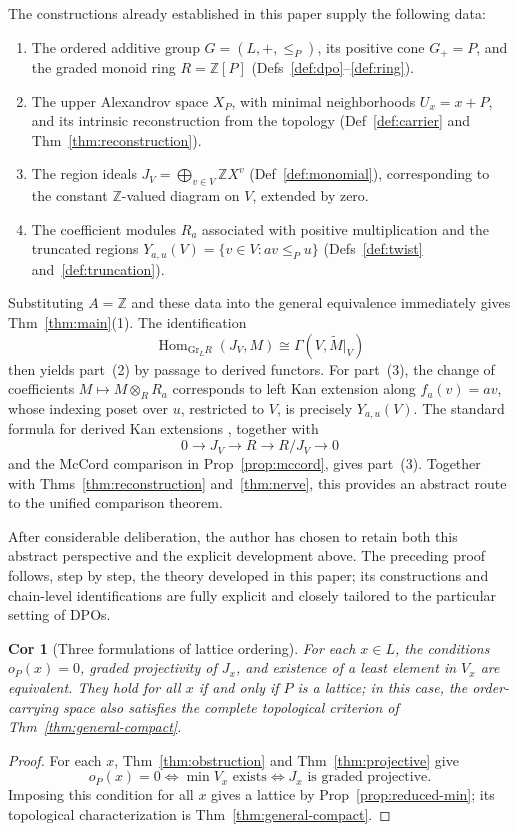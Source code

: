 \documentclass[10pt,letterpaper]{amsart}
\numberwithin{equation}{section}
\newtheorem{cor}[thm]{Cor}
\theoremstyle{definition}
\newcommand{\Z}{\mathbb Z}
\newcommand{\Gr}{\mathrm{Gr}}
\newcommand{\Hom}{\operatorname{Hom}}
\begin{document}
The constructions already established in this paper supply the following data:
\begin{enumerate}
\item The ordered additive group $G=(L,+,\le_P)$, its positive cone $G_+=P$, and the graded monoid ring $R=\Z[P]$ (Defs~\ref{def:dpo}--\ref{def:ring}).
\item The upper Alexandrov space $X_P$, with minimal neighborhoods $U_x=x+P$, and its intrinsic reconstruction from the topology (Def~\ref{def:carrier} and Thm~\ref{thm:reconstruction}).
\item The region ideals $J_V=\bigoplus_{v\in V}\Z X^v$ (Def~\ref{def:monomial}), corresponding to the constant $\Z$-valued diagram on $V$, extended by zero.
\item The coefficient modules $R_a$ associated with positive multiplication and the truncated regions $Y_{a,u}(V)=\{v\in V:av\le_Pu\}$ (Defs~\ref{def:twist} and~\ref{def:truncation}).
\end{enumerate}

Substituting $A=\Z$ and these data into the general equivalence immediately gives Thm~\ref{thm:main}(1). The identification
\[
\Hom_{\Gr_LR}(J_V,M)
\cong \Gamma(V,\widetilde M|_V)
\]
then yields part~(2) by passage to derived functors. For part~(3), the change of coefficients $M\mapsto M\otimes_RR_a$ corresponds to left Kan extension along $f_a(v)=av$, whose indexing poset over $u$, restricted to $V$, is precisely $Y_{a,u}(V)$. The standard formula for derived Kan extensions \cite[\S1.3]{Dj}, together with
\[
0\longrightarrow J_V\longrightarrow R\longrightarrow R/J_V\longrightarrow0
\]
and the McCord comparison in Prop~\ref{prop:mccord}, gives part~(3). Together with Thms~\ref{thm:reconstruction} and~\ref{thm:nerve}, this provides an abstract route to the unified comparison theorem.

After considerable deliberation, the author has chosen to retain both this abstract perspective and the explicit development above. The preceding proof follows, step by step, the theory developed in this paper; its constructions and chain-level identifications are fully explicit and closely tailored to the particular setting of DPOs.
\par\medskip

\begin{cor}[Three formulations of lattice ordering]\label{cor:three-lattice}
For each $x\in L$, the conditions $o_P(x)=0$, graded projectivity of $J_x$, and existence of a least element in $V_x$ are equivalent. They hold for all $x$ if and only if $P$ is a lattice; in this case, the order-carrying space also satisfies the complete topological criterion of Thm~\ref{thm:general-compact}.
\end{cor}
\begin{proof}
For each $x$, Thm~\ref{thm:obstruction} and Thm~\ref{thm:projective} give
\[
o_P(x)=0\iff\min V_x\text{ exists}\iff J_x\text{ is graded projective}.
\]
Imposing this condition for all $x$ gives a lattice by Prop~\ref{prop:reduced-min}; its topological characterization is Thm~\ref{thm:general-compact}.
\end{proof}
\end{document}

